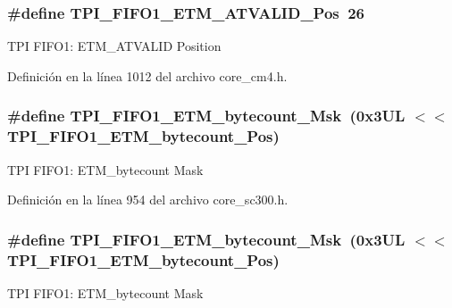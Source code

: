 \subsubsection[{\texorpdfstring{T\+P\+I\+\_\+\+F\+I\+F\+O1\+\_\+\+E\+T\+M\+\_\+\+A\+T\+V\+A\+L\+I\+D\+\_\+\+Pos}{TPI_FIFO1_ETM_ATVALID_Pos}}]{\setlength{\rightskip}{0pt plus 5cm}\#define T\+P\+I\+\_\+\+F\+I\+F\+O1\+\_\+\+E\+T\+M\+\_\+\+A\+T\+V\+A\+L\+I\+D\+\_\+\+Pos~26}\hypertarget{group___c_m_s_i_s___t_p_i_ga3177b8d815cf4a707a2d3d3d5499315d}{}\label{group___c_m_s_i_s___t_p_i_ga3177b8d815cf4a707a2d3d3d5499315d}
T\+PI F\+I\+F\+O1\+: E\+T\+M\+\_\+\+A\+T\+V\+A\+L\+ID Position 

Definición en la línea 1012 del archivo core\+\_\+cm4.\+h.

\subsubsection[{\texorpdfstring{T\+P\+I\+\_\+\+F\+I\+F\+O1\+\_\+\+E\+T\+M\+\_\+bytecount\+\_\+\+Msk}{TPI_FIFO1_ETM_bytecount_Msk}}]{\setlength{\rightskip}{0pt plus 5cm}\#define T\+P\+I\+\_\+\+F\+I\+F\+O1\+\_\+\+E\+T\+M\+\_\+bytecount\+\_\+\+Msk~(0x3\+U\+L $<$$<$ T\+P\+I\+\_\+\+F\+I\+F\+O1\+\_\+\+E\+T\+M\+\_\+bytecount\+\_\+\+Pos)}\hypertarget{group___c_m_s_i_s___t_p_i_gab554305459953b80554fdb1908b73291}{}\label{group___c_m_s_i_s___t_p_i_gab554305459953b80554fdb1908b73291}
T\+PI F\+I\+F\+O1\+: E\+T\+M\+\_\+bytecount Mask 

Definición en la línea 954 del archivo core\+\_\+sc300.\+h.

\subsubsection[{\texorpdfstring{T\+P\+I\+\_\+\+F\+I\+F\+O1\+\_\+\+E\+T\+M\+\_\+bytecount\+\_\+\+Msk}{TPI_FIFO1_ETM_bytecount_Msk}}]{\setlength{\rightskip}{0pt plus 5cm}\#define T\+P\+I\+\_\+\+F\+I\+F\+O1\+\_\+\+E\+T\+M\+\_\+bytecount\+\_\+\+Msk~(0x3\+U\+L $<$$<$ T\+P\+I\+\_\+\+F\+I\+F\+O1\+\_\+\+E\+T\+M\+\_\+bytecount\+\_\+\+Pos)}\hypertarget{group___c_m_s_i_s___t_p_i_gab554305459953b80554fdb1908b73291}{}\label{group___c_m_s_i_s___t_p_i_gab554305459953b80554fdb1908b73291}
T\+PI F\+I\+F\+O1\+: E\+T\+M\+\_\+bytecount Mask 

